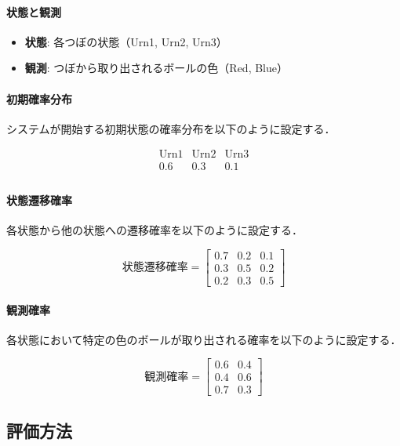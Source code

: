 \documentclass[dvipdfmx,titlepage,a4j]{jsarticle}
\begin{document}
\paragraph{状態と観測}
\begin{itemize}
    \item \textbf{状態}: 各つぼの状態（Urn1, Urn2, Urn3）
    \item \textbf{観測}: つぼから取り出されるボールの色（Red, Blue）
\end{itemize}

\paragraph{初期確率分布}

システムが開始する初期状態の確率分布を以下のように設定する．

\[
    \begin{array}{ccc}
        \text{Urn1} & \text{Urn2} & \text{Urn3} \\
        0.6         & 0.3         & 0.1         \\
    \end{array}
\]

\paragraph{状態遷移確率}

各状態から他の状態への遷移確率を以下のように設定する．

\[
    \text{状態遷移確率} =
    \begin{bmatrix}
        0.7 & 0.2 & 0.1 \\
        0.3 & 0.5 & 0.2 \\
        0.2 & 0.3 & 0.5
    \end{bmatrix}
\]

\paragraph{観測確率}

各状態において特定の色のボールが取り出される確率を以下のように設定する．

\[
    \text{観測確率} =
    \begin{bmatrix}
        0.6 & 0.4 \\
        0.4 & 0.6 \\
        0.7 & 0.3
    \end{bmatrix}
\]

\subsection{評価方法}
\end{document}
